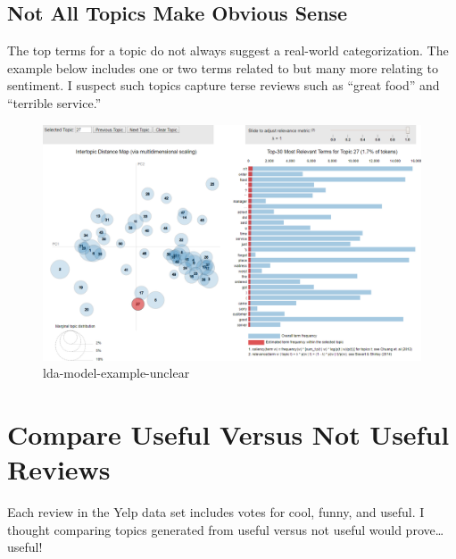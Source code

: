 \documentclass[11pt]{article}
\makeatletter
\def\maxwidth{\ifdim\Gin@nat@width>\linewidth\linewidth
    \else\Gin@nat@width\fi}
\let\Oldincludegraphics\includegraphics
\renewcommand{\includegraphics}[1]{\Oldincludegraphics[width=.8\maxwidth]{#1}}
\makeatother
\begin{document}
    \hypertarget{not-all-topics-make-obvious-sense}{%
\subsection{Not All Topics Make Obvious
Sense}\label{not-all-topics-make-obvious-sense}}

The top terms for a topic do not always suggest a real-world
categorization. The example below includes one or two terms related to
but many more relating to sentiment. I suspect such topics capture terse
reviews such as ``great food'' and ``terrible service.''

\begin{figure}
\centering
\includegraphics{ntbk-imgs/task01-lda-model-example-unclear.PNG}
\caption{lda-model-example-unclear}
\end{figure}

    \hypertarget{compare-useful-versus-not-useful-reviews}{%
\section{Compare Useful Versus Not Useful
Reviews}\label{compare-useful-versus-not-useful-reviews}}

Each review in the Yelp data set includes votes for cool, funny, and
useful. I thought comparing topics generated from useful versus not
useful would prove\ldots{} useful!
\end{document}
